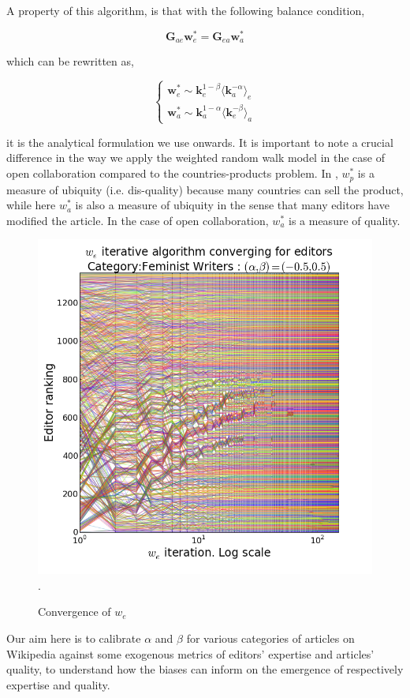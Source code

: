A property of this algorithm, is that with the following balance condition,

\begin{equation}
\mathbf{G}_{ae} \mathbf{w}^*_e = \mathbf{G}_{ea} \mathbf{w}^*_a
\end{equation}

which can be rewritten as,

\begin{equation}
\begin{cases}
\mathbf{w}^{*}_{e} \sim \mathbf{k}^{1-\beta}_{e} \langle \mathbf{k}_{a}^{-\alpha}\rangle_e \\
\mathbf{w}^{*}_{a} \sim \mathbf{k}^{1-\alpha}_{a} \langle \mathbf{k}_{e}^{-\beta}\rangle_a
\end{cases} \label{eqsim}
\end{equation}



it is the analytical formulation we use onwards. It is important to note a crucial difference in the way we apply the weighted random walk model in the case of open collaboration compared to the countries-products problem. In \cite{caldarelli2012network}, $w^*_p$ is a measure of ubiquity (i.e. dis-quality) because many countries can sell the product, while here $w^*_a$ is also a measure of ubiquity in the sense that many editors have modified the article. In the case of open collaboration, $w^*_a$ is a measure of quality.

\begin{figure}[!t]
\centering
\includegraphics[width=0.9\columnwidth]{Figures/fem_editors_iter_converge.png}.
\caption{Convergence of $w_e$}
\label{fig:convergence}
\end{figure}




Our aim here is to calibrate $\alpha$ and $\beta$ for various categories of articles on Wikipedia against some exogenous metrics of editors' expertise and articles' quality, to understand how the biases can inform on the emergence of respectively expertise and quality.